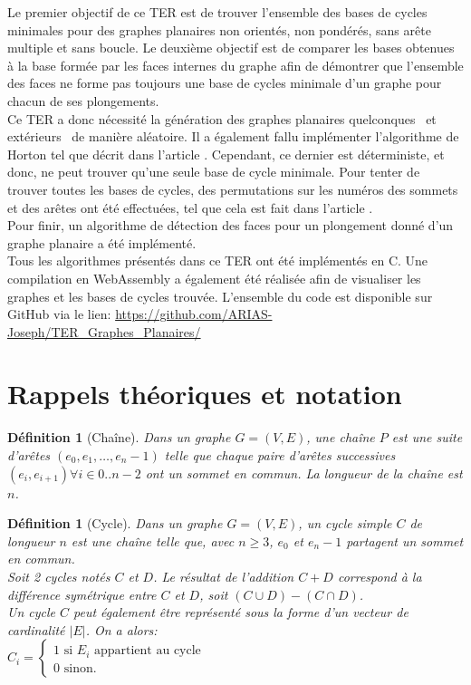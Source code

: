 \documentclass{article}
\newtheorem{definition}[theorem]{Définition}
\begin{document}
Le premier objectif de ce TER est de trouver l'ensemble des bases de cycles minimales pour des graphes planaires non orientés, non pondérés, sans arête multiple et sans boucle. Le deuxième objectif est de comparer les bases obtenues à la base formée par les faces internes du graphe afin de démontrer que l'ensemble des faces ne forme pas toujours une base de cycles minimale d'un graphe pour chacun de ses plongements. \\
Ce TER a donc nécessité la génération des graphes planaires \og quelconques \fg\ et \og extérieurs \fg\ de manière aléatoire. Il a également fallu implémenter l'algorithme de Horton tel que décrit dans l'article \cite{Horton1984}. Cependant, ce dernier est déterministe, et donc, ne peut trouver qu'une seule base de cycle minimale. Pour tenter de trouver toutes les bases de cycles, des permutations sur les numéros des sommets et des arêtes ont été effectuées, tel que cela est fait dans l'article \cite{Vismara1997}. \\
Pour finir, un algorithme de détection des faces pour un plongement donné d'un graphe planaire a été implémenté. \\
Tous les algorithmes présentés dans ce TER ont été implémentés en C. Une compilation en WebAssembly a également été réalisée afin de visualiser les graphes et les bases de cycles trouvée. L'ensemble du code est disponible sur GitHub via le lien: \url{https://github.com/ARIAS-Joseph/TER_Graphes_Planaires/}

\section{Rappels théoriques et notation}

\begin{definition}[Chaîne]
Dans un graphe $G=(V,E)$, une chaîne $P$ est une suite d'arêtes $(e_0, e_1,\ldots,e_n-1)$ telle que chaque paire d'arêtes successives  $(e_i, e_{i+1}) \forall i \in 0..n-2$ ont un sommet en commun. La longueur de la chaîne est $n$.
\end{definition}

\begin{definition}[Cycle]
Dans un graphe $G=(V,E)$, un cycle simple $C$ de longueur $n$ est une chaîne telle que, avec $n \geq 3$, $e_0$ et $e_n-1$ partagent un sommet en commun.\\
Soit 2 cycles notés $C$ et $D$. Le résultat de l'addition $C+D$ correspond à la différence symétrique entre $C$ et $D$, soit $(C \cup D) - (C \cap D)$.\\
Un cycle $C$ peut également être représenté sous la forme d'un vecteur de cardinalité $\lvert E \rvert $. On a alors: \\

$C_i= \left \{
    \begin{array}{ll}
        1 \text{ si } E_i \text{ appartient au cycle} \\
        0 \text{ sinon.}
    \end{array}
\right.$
\end{definition}
\end{document}
